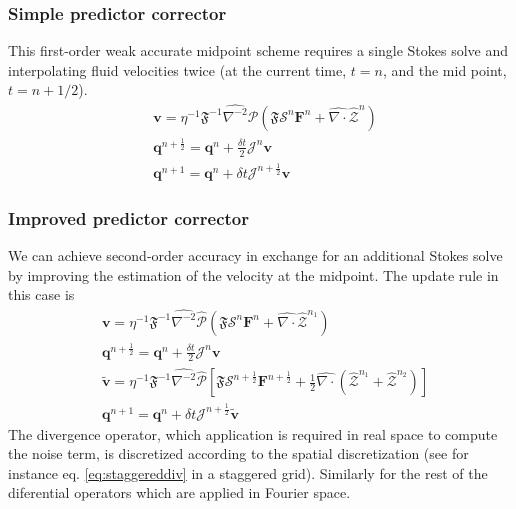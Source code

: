 \documentclass[ twoside,openright,titlepage,numbers=noenddot,%
headinclude,footinclude,cleardoublepage=empty,abstract=on,
BCOR=5mm,paper=a4,fontsize=11pt, dvipsnames
]{scrreprt}
\renewcommand{\vec}[1]{\bm{#1}}
\newcommand{\oper}[1]{\mathcal{#1}}
\newcommand{\dt}{\delta t}
\newcommand{\half}{\frac{1}{2}}
\newcommand{\fou}[1]{\widehat{#1}}
\newcommand{\ppos}{q}
\newcommand{\fvel}{v}
\begin{document}
\subsubsection*{Simple predictor corrector}
This first-order weak accurate midpoint scheme requires a single Stokes solve and interpolating fluid velocities twice (at the current time, $t=n$, and the mid point, $t=n+1/2$).
\begin{equation}
  \begin{aligned}
    &\vec{\fvel} = \eta^{-1}\mathfrak{F}^{-1}\fou{\nabla^{-2}}\fou{\oper{P}}(\mathfrak{F}\oper{S}^{n}\vec{F}^{n} + \fou{\nabla\cdot}\fou{\mathcal{Z}}^{n})\\
    &\vec{\ppos}^{n+\half} = \vec{\ppos}^n + \frac{\dt}{2}\oper{J}^n\vec{\fvel}\\
    &\vec{\ppos}^{n+1} = \vec{\ppos}^n + \dt\oper{J}^{n+\half}\vec{\fvel}
  \end{aligned}
\end{equation}
\subsubsection*{Improved predictor corrector}
We can achieve second-order accuracy in exchange for an additional Stokes solve by improving the estimation of the velocity at the midpoint. The update rule in this case is 
\begin{equation}
  \begin{aligned}
    &\vec{\fvel} = \eta^{-1}\mathfrak{F}^{-1}\fou{\nabla^{-2}}\fou{\oper{P}}(\mathfrak{F}\oper{S}^{n}\vec{F}^{n} + \fou{\nabla\cdot}\fou{\mathcal{Z}}^{n_1})\\
    &\vec{\ppos}^{n+\half} = \vec{\ppos}^n + \frac{\dt}{2}\oper{J}^n\vec{\fvel}\\
    &\tilde{\vec{\fvel}}= \eta^{-1}\mathfrak{F}^{-1}\fou{\nabla^{-2}}\fou{\oper{P}}\left[\mathfrak{F}\oper{S}^{n+\half}\vec{F}^{n+\half} + \half\fou{\nabla\cdot}\left(\fou{\mathcal{Z}}^{n_1} +  \fou{\mathcal{Z}}^{n_2}\right)\right]\\
    &\vec{\ppos}^{n+1}= \vec{\ppos}^n + \dt\oper{J}^{n+\half}\tilde{\vec{\fvel}}
  \end{aligned}      
\end{equation}
The divergence operator, which application is required in real space to compute the noise term, is discretized according to the spatial discretization (see for instance eq. \eqref{eq:staggereddiv} in a staggered grid). Similarly for the rest of the diferential operators which are applied in Fourier space.
\end{document}

